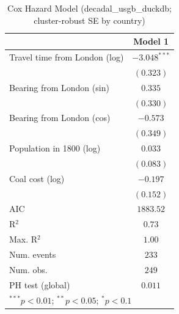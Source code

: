 
\begin{table}
\begin{center}
\begin{tabular}{l c}
\hline
 & Model 1 \\
\hline
Travel time from London (log) & $-3.048^{***}$ \\
 & $(0.323)$ \\
Bearing from London (sin) & $0.335$ \\
 & $(0.330)$ \\
Bearing from London (cos) & $-0.573$ \\
 & $(0.349)$ \\
Population in 1800 (log) & $0.033$ \\
 & $(0.083)$ \\
Coal cost (log) & $-0.197$ \\
 & $(0.152)$ \\
\hline
AIC              & $1883.52$ \\
R$^2$            & $0.73$ \\
Max. R$^2$       & $1.00$ \\
Num. events      & $233$ \\
Num. obs.        & $249$ \\
PH test (global) & $0.011$ \\
\hline
\multicolumn{2}{l}{\scriptsize{$^{***}p<0.01$; $^{**}p<0.05$; $^{*}p<0.1$}}
\end{tabular}
\caption{Cox Hazard Model (decadal\_usgb\_duckdb; cluster-robust SE by country)}
\label{tab:cox_serious_decadal_usgb_duckdb}
\end{center}
\end{table}
